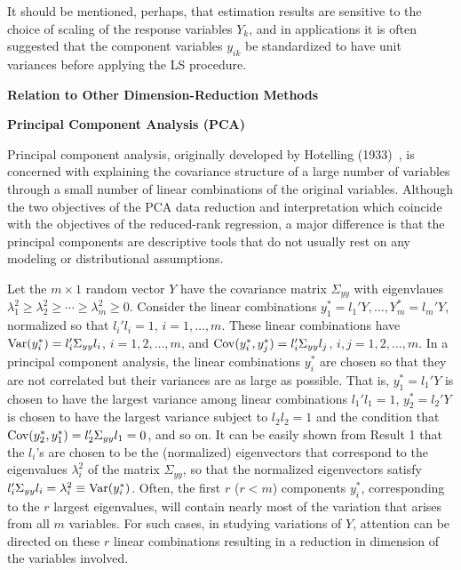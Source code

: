 It should be mentioned, perhaps, that estimation results are sensitive to the choice of scaling of the response variables $Y_k$, and in applications it is often suggested that the component variables $y_{ik}$ be standardized to have unit variances before applying the LS procedure. \twomedskip


\noindent \textbf{Relation to Other Dimension-Reduction Methods} \twomedskip


\noindent\textbf{Principal Component Analysis (PCA)} \twomedskip


\noindent Principal component analysis, originally developed by Hotelling (1933)~\cite{hotelling33}, is concerned with explaining the covariance structure of a large number of variables through a small number of linear combinations of the original variables. Although the two objectives of the PCA data reduction and interpretation which coincide with the objectives of the reduced-rank regression, a major difference is that the principal components are descriptive tools that do not usually rest on any modeling or distributional assumptions. 


Let the $m \times 1$ random vector $Y$ have the covariance matrix $\Sigma_{yy}$ with eigenvlaues $\lambda_1^2 \geq \lambda_2^2 \geq \cdots \geq \lambda_m^2 \geq 0$. Consider the linear combinations $y_1^*= l_1' Y, \ldots, Y_m^* = l_m' Y$, normalized so that $l_i' l_i=1$, $i=1, \ldots, m$. These linear combinations have $\operatorname{Var}(y_i^*)= l_i' \Sigma_{yy} l_i$, $i= 1, 2, \ldots, m$, and $\operatorname{Cov}(y_i^*,y_j^*)= l_i' \Sigma_{yy} l_j$, $i,j= 1, 2, \ldots, m$. In a principal component analysis, the linear combinations $y_i^*$ are chosen so that they are not correlated but their variances are as large as possible. That is, $y_1^*= l_1' Y$ is chosen to have the largest variance among linear combinations $l_1' l_1= 1$, $y_2^*= l_2' Y$ is chosen to have the largest variance subject to $l_2 l_2=1$ and the condition that $\operatorname{Cov}(y_2^*,y_1^*)= l_2' \Sigma_{yy}l_1=0$, and so on. It can be easily shown from Result 1 that the $l_i$'s are chosen to be the (normalized) eigenvectors that correspond to the eigenvalues $\lambda_i^2$ of the matrix $\Sigma_{yy}$, so that the normalized eigenvectors satisfy $l_i' \Sigma_{yy}l_i= \lambda_i^2 \equiv \operatorname{Var}(y_i^*)$. Often, the first $r$ ($r<m$) components $y_i^*$, corresponding to the $r$ largest eigenvalues, will contain nearly most of the variation that arises from all $m$ variables. For such cases, in studying variations of $Y$, attention can be directed on these $r$ linear combinations resulting in a reduction in dimension of the variables involved. 


